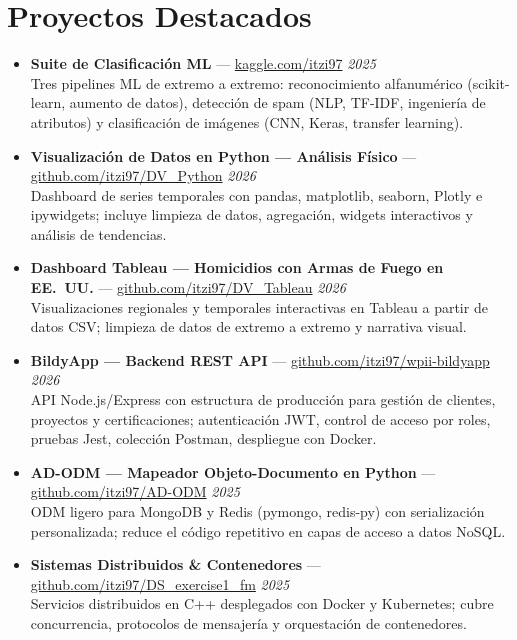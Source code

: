 \documentclass[10pt,a4paper]{article}
\begin{document}
\section{Proyectos Destacados}
{\small
\begin{itemize}

  \item \textbf{Suite de Clasificaci\'on ML} --- \href{https://www.kaggle.com/itzi97}{kaggle.com/itzi97} \hfill \textit{2025}\\
  Tres pipelines ML de extremo a extremo: reconocimiento alfanum\'erico (scikit-learn, aumento de datos),
  detecci\'on de spam (NLP, TF-IDF, ingenier\'ia de atributos) y clasificaci\'on de im\'agenes (CNN, Keras,
  transfer learning).

  \item \textbf{Visualizaci\'on de Datos en Python --- An\'alisis F\'isico} --- \href{https://github.com/itzi97/DV_Python}{github.com/itzi97/DV\_Python} \hfill \textit{2026}\\
  Dashboard de series temporales con pandas, matplotlib, seaborn, Plotly e ipywidgets;
  incluye limpieza de datos, agregaci\'on, widgets interactivos y an\'alisis de tendencias.

  \item \textbf{Dashboard Tableau --- Homicidios con Armas de Fuego en EE.~UU.} --- \href{https://github.com/itzi97/DV_Tableau}{github.com/itzi97/DV\_Tableau} \hfill \textit{2026}\\
  Visualizaciones regionales y temporales interactivas en Tableau a partir de datos CSV;
  limpieza de datos de extremo a extremo y narrativa visual.

  \item \textbf{BildyApp --- Backend REST API} --- \href{https://github.com/itzi97/wpii-bildyapp}{github.com/itzi97/wpii-bildyapp} \hfill \textit{2026}\\
  API Node.js/Express con estructura de producci\'on para gesti\'on de clientes, proyectos y certificaciones;
  autenticaci\'on JWT, control de acceso por roles, pruebas Jest, colecci\'on Postman, despliegue con Docker.

  \item \textbf{AD-ODM --- Mapeador Objeto-Documento en Python} --- \href{https://github.com/itzi97/AD-ODM}{github.com/itzi97/AD-ODM} \hfill \textit{2025}\\
  ODM ligero para MongoDB y Redis (pymongo, redis-py) con serializaci\'on personalizada;
  reduce el c\'odigo repetitivo en capas de acceso a datos NoSQL.

  \item \textbf{Sistemas Distribuidos \& Contenedores} --- \href{https://github.com/itzi97/DS_exercise1_fm}{github.com/itzi97/DS\_exercise1\_fm} \hfill \textit{2025}\\
  Servicios distribuidos en C++ desplegados con Docker y Kubernetes;
  cubre concurrencia, protocolos de mensajer\'ia y orquestaci\'on de contenedores.

\end{itemize}
}
\end{document}
